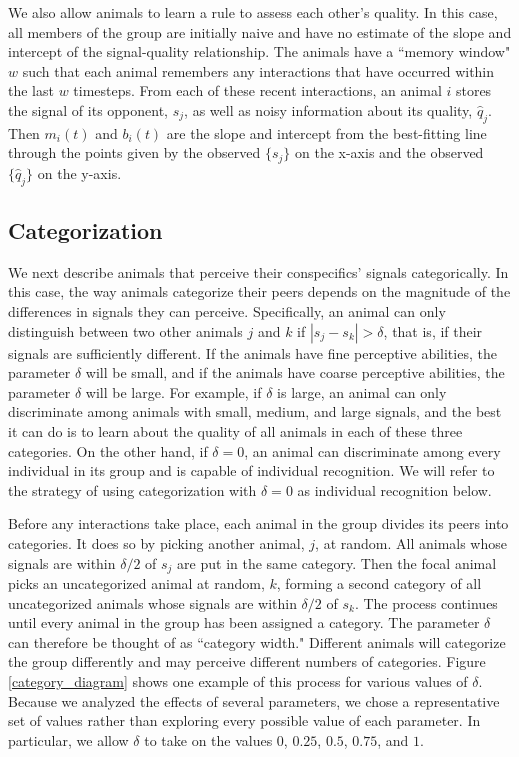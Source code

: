 We also allow animals to learn a rule to assess each other's quality. In this case, all members of the group are initially naive and have no estimate of the slope and intercept of the signal-quality relationship. The animals have a ``memory window" $w$ such that each animal remembers any interactions that have occurred within the last $w$ timesteps. From each of these recent interactions, an animal $i$ stores the signal of its opponent, $s_j$, as well as noisy information about its quality, $\hat{q}_j$.  Then $m_i(t)$ and $b_i(t)$ are the slope and intercept from the best-fitting line through the points given by the observed $\{s_j\}$ on the x-axis and the observed $\{\hat{q}_j\}$ on the y-axis.   

\subsection*{Categorization}
We next describe animals that perceive their conspecifics' signals categorically. In this case, the way animals categorize their peers depends on the magnitude of the differences in signals they can perceive. Specifically, an animal can only distinguish between two other animals $j$ and $k$ if $|s_j-s_k|>\delta$, that is, if their signals are sufficiently different. If the animals have fine perceptive abilities, the parameter $\delta$ will be small, and if the animals have coarse perceptive abilities, the parameter $\delta$ will be large. For example, if $\delta$ is large, an animal can only discriminate among animals with small, medium, and large signals, and the best it can do is to learn about the quality of all animals in each of these three categories. On the other hand, if $\delta=0$, an animal can discriminate among every individual in its group and is capable of individual recognition. We will refer to the strategy of using categorization with $\delta=0$ as individual recognition below.

Before any interactions take place, each animal in the group divides its peers into categories. It does so by picking another animal, $j$, at random. All animals whose signals are within $\delta/2$ of $s_j$ are put in the same category. Then the focal animal picks an uncategorized animal at random, $k$, forming a second category of all uncategorized animals whose signals are within $\delta/2$ of $s_k$. The process continues until every animal in the group has been assigned a category. The parameter $\delta$ can therefore be thought of as ``category width."  Different animals will categorize the group differently and may perceive different numbers of categories. Figure \ref{category_diagram} shows one example of this process for various values of $\delta$. Because we analyzed the effects of several parameters, we chose a representative set of values rather than exploring every possible value of each parameter. In particular, we allow $\delta$ to take on the values $0$, $0.25$, $0.5$, $0.75$, and $1$.

